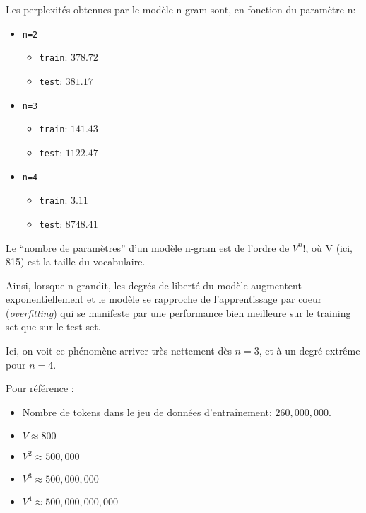 Les perplexités obtenues par le modèle n-gram sont, en fonction du
paramètre n:

\begin{itemize}
\tightlist
\item
  \texttt{n=2}

  \begin{itemize}
  \tightlist
  \item
    \texttt{train}: \(378.72\)
  \item
    \texttt{test}: \(381.17\)
  \end{itemize}
\item
  \texttt{n=3}

  \begin{itemize}
  \tightlist
  \item
    \texttt{train}: \(141.43\)
  \item
    \texttt{test}: \(1122.47\)
  \end{itemize}
\item
  \texttt{n=4}

  \begin{itemize}
  \tightlist
  \item
    \texttt{train}: \(3.11\)
  \item
    \texttt{test}: \(8748.41\)
  \end{itemize}
\end{itemize}

Le ``nombre de paramètres'' d'un modèle n-gram est de l'ordre de
\(V^n!\), où V (ici, 815) est la taille du vocabulaire.

Ainsi, lorsque n grandit, les degrés de liberté du modèle augmentent
exponentiellement et le modèle se rapproche de l'apprentissage par coeur
(\emph{overfitting}) qui se manifeste par une performance bien meilleure
sur le training set que sur le test set.

Ici, on voit ce phénomène arriver très nettement dès \(n=3\), et à un
degré extrême pour \(n=4\).

Pour référence :

\begin{itemize}
\tightlist
\item
  Nombre de tokens dans le jeu de données d'entraînement:
  \(260,000,000\).
\item
  \(V \approx 800\)
\item
  \(V^2 \approx 500,000\)
\item
  \(V^3 \approx 500,000,000\)
\item
  \(V^4 \approx 500,000,000,000\)
\end{itemize}

